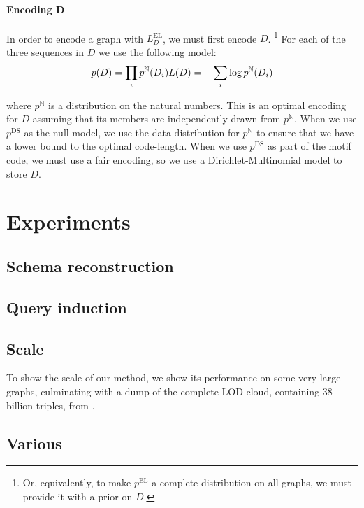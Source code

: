 \documentclass[11pt]{article}
\newcommand{\N}{{\mathbb N}}
\begin{document}
 
 \paragraph{Encoding D} In order to encode a graph with $L^\text{EL}_D$, we must first encode $D$. \footnote{Or, equivalently, to make $p^\text{EL}$ a complete distribution on all graphs, we must provide it with a prior on $D$.} For each of the three sequences in $D$ we use the following model:
\[
 p(D) = \prod_i p^{\N}(D_i) \\
 L(D) = - \sum_i \log p^{\N}(D_i)
\]

where $p^{\N}$ is a distribution on the natural numbers. This is an optimal encoding for $D$ assuming that its members are independently drawn from $p^{\N}$. When we use $p^\text{DS}$ as the null model, we use the data distribution for $p^{\N}$ to ensure that we have a lower bound to the optimal code-length. When we use $p^\text{DS}$ as part of the motif code, we must use a fair encoding, so we use a Dirichlet-Multinomial model to store $D$.
 
\section{Experiments}



\subsection{Schema reconstruction}

\subsection{Query induction}

\subsection{Scale}

To show the scale of our method, we show its performance on some very large graphs, culminating with a dump of the complete LOD cloud, containing 38 billion triples, from \cite{}.

\subsection{Various}
\end{document}
